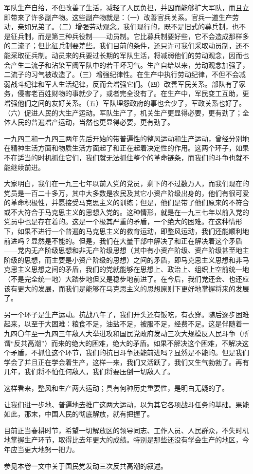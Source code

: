 军队生产自给，不但改善了生活，减轻了人民负担，并因而能够扩大军队，而且立即带来了许多副产物。这些副产物就是：（一）改善官兵关系。官兵一道生产劳动，亲如兄弟了。（二）增强劳动观念。我们现行的，既不是旧式的募兵制，也不是征兵制，而是第三种兵役制——动员制。它比募兵制要好些，它不会造成那样多的二流子；但比征兵制要差些。我们目前的条件，还只许可我们采取动员制，还不能采取征兵制。动员来的兵要过长期的军队生活，将减弱他们的劳动观念，因而也会产生二流子和沾染军阀军队中的若干坏习气。生产自给以来，劳动观念加强了，二流子的习气被改造了。（三）增强纪律性。在生产中执行劳动纪律，不但不会减弱战斗纪律和军人生活纪律，反而会增强它们。（四）改善军民关系。部队有了家务，侵害老百姓财物的事就少了，或者完全没有了。在生产中，军民变工互助，更增强他们之间的友好关系。（五）军队埋怨政府的事也会少了，军政关系也好了。（六）促进人民的大生产运动。军队生产了，机关生产更显得必要，更有劲了；全体人民的普遍增产运动，当然也更显得必要，更有劲了。

一九四二和一九四三两年先后开始的带普遍性的整风运动和生产运动，曾经分别地在精神生活方面和物质生活方面起了和正在起着决定性的作用。这两个环子，如果不在适当的时机抓住它们，我们就无法抓住整个的革命链条，而我们的斗争也就不能继续前进。

大家明白，我们在一九三七年以前入党的党员，剩下的不过数万人，而我们现在的党员是一百二十多万，其中大多数是农民及其它小资产阶级出身的，他们有很可爱的革命积极性，并愿接受马克思主义的训练；但是，他们是带了他们原来的不符合或不大符合于马克思主义的思想入党的。这种情形，就是在一九三七年以前入党的党员中也是存在着的。这是一个极其严重的矛盾，一个绝大的困难。在这种情形下，如果不进行一个普遍的马克思主义的教育运动，即整风运动，我们还能顺利地前进吗？显然是不能的。但是，我们在大量干部中解决了和正在解决着这个矛盾——党内无产阶级思想和非无产阶级思想（其中有小资产阶级、资产阶级甚至地主阶级的思想，而主要是小资产阶级的思想）之间的矛盾，即马克思主义思想和非马克思主义思想之间的矛盾，我们的党就能够在思想上、政治上、组织上空前统一地（不是完全统一地）大踏步地但又是稳步地前进了。在今后，我们党还会、也还应该有更大的发展，而我们是能够在马克思主义的思想原则下更好地掌握将来的发展了。

另一个环子是生产运动。抗战八年了，我们开头还有饭吃，有衣穿。随后逐步困难起来，以至于大困难：粮食不足，油盐不足，被服不足，经费不足。这是伴随着一九四〇年至一九四三年敌人大举进攻和国民党政府发动三次大规模反人民斗争（所谓“反共高潮”）而来的绝大的困难，绝大的矛盾。如果不解决这个困难，不解决这个矛盾，不抓住这个环节，我们的抗日斗争还能前进吗？显然是不能的。但是我们学会了并且正在学会着生产，这样一来，我们又活跃了，我们又生气勃勃了。再有几年，我们将不怕任何敌人，我们将要压倒一切敌人了。

这样看来，整风和生产两大运动；具有何种历史重要性，是明白无疑的了。

让我们进一步地、普遍地去推广这两大运动，以为其它各项战斗任务的基础。果能如此，那末，中国人民的彻底解放，就有把握了。

目前正当春耕时节，希望一切解放区的领导同志、工作人员、人民群众，不失时机地掌握生产环节，取得比去年更大的成绩。特别是那些还没有学会生产的地区，今年应当更大地努一把力。


\begin{maonote}
参见本卷一文中关于国民党发动三次反共高潮的叙述。
\end{maonote}

